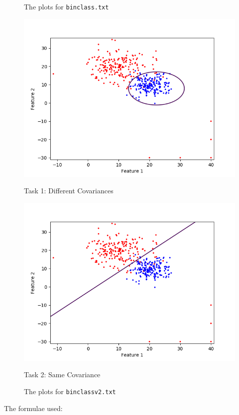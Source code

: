 \documentclass[a4paper,11pt]{article}
\begin{document}
\begin{mlsolution}
\begin{figure}[h]
        \caption{The plots for \texttt{binclass.txt}}
    \end{figure}
    \begin{figure}[h]
        \centering
        \begin{minipage}{0.5\textwidth}
            \centering
            \includegraphics[width=\textwidth]{Part2_Task1.png} %
            \caption*{Task 1: Different Covariances}
        \end{minipage}\hfill
        \begin{minipage}{0.5\textwidth}
            \centering
            \includegraphics[width=\textwidth]{Part2_Task2.png} %
            \caption*{Task 2: Same Covariance}
        \end{minipage}
        \caption{The plots for \texttt{binclassv2.txt}}
    \end{figure}
    \pagebreak
    The formulae used:


\end{mlsolution}
\end{document}
